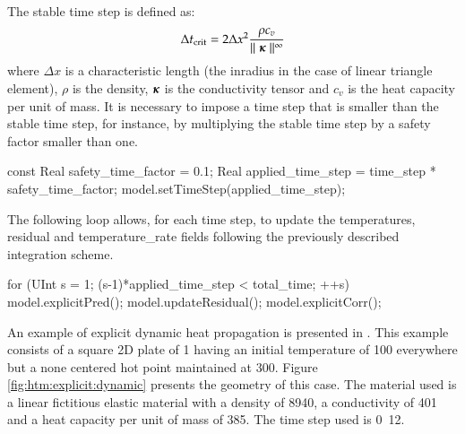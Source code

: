 The stable time step is defined as:
\begin{equation}\label{eqn:smm:explicit:stabletime}
  \Delta t_{{\mathrm{crit}}} = 2 \Delta x^2 \frac{\rho c_v}{\mid\mid \boldsymbol{\kappa} \mid\mid^\infty}
\end{equation}
where $\Delta  x$ is a  characteristic length (\eg  the inradius in the  case of
linear triangle  element), $\rho$ is the density, $\boldsymbol{\kappa}$ is the conductivity tensor
and $c_v$ is the heat capacity per unit of mass. It is
necessary to impose a  time step that is smaller than the  stable time step, for
instance, by  multiplying the stable time  step by a safety  factor smaller than
one.

\begin{cpp}
  const Real safety_time_factor = 0.1;
  Real applied_time_step = time_step * safety_time_factor;
  model.setTimeStep(applied_time_step);
\end{cpp}


The following loop  allows, for each time  step, to update the  temperatures, residual and
temperature\_rate  fields  following the previously described integration scheme.

\begin{cpp}
  for (UInt s = 1; (s-1)*applied_time_step < total_time; ++s) {
    model.explicitPred();
    model.updateResidual();
    model.explicitCorr();  
  }
\end{cpp}

An    example    of    explicit     dynamic    heat propagation is    presented    in
.  This example  consists of a square 2D plate of \unit{1}{\squaremetre} 
having an initial temperature of \unit{100}{\kelvin} everywhere but a none centered hot point 
maintained at \unit{300}{\kelvin}. Figure \ref{fig:htm:explicit:dynamic} presents the
geometry of this case. The material used is a linear fictitious elastic material
with  a density  of  \unit{8940}{\kilogrampercubicmetre}, a  conductivity of 
\unit{401}{\watt\per\metre\per\kelvin} and a heat capacity per unit of mass  of \unit{385}{\joule\per\kelvin\per\kilogram}. The time step used is \unit{0.12}{\second}.

